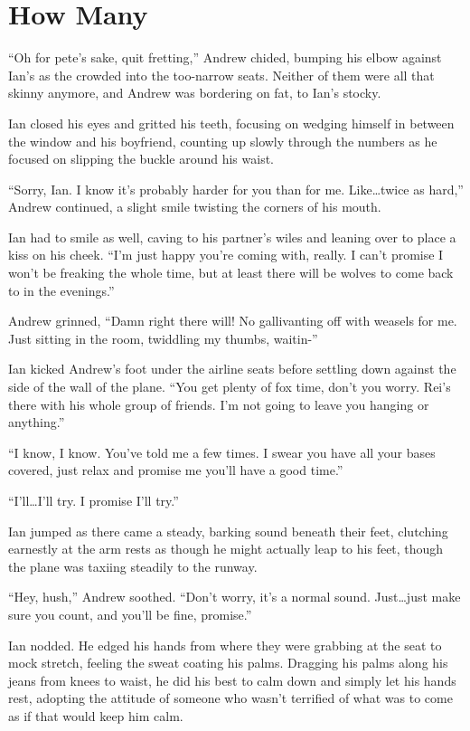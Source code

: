 \chapter{How Many}

``Oh for pete's sake, quit fretting,'' Andrew chided, bumping his elbow against Ian's as the crowded into the too-narrow seats. Neither of them were all that skinny anymore, and Andrew was bordering on fat, to Ian's stocky.

Ian closed his eyes and gritted his teeth, focusing on wedging himself in between the window and his boyfriend, counting up slowly through the numbers as he focused on slipping the buckle around his waist.

``Sorry, Ian. I know it's probably harder for you than for me. Like\ldots{}twice as hard,'' Andrew continued, a slight smile twisting the corners of his mouth.

Ian had to smile as well, caving to his partner's wiles and leaning over to place a kiss on his cheek. ``I'm just happy you're coming with, really. I can't promise I won't be freaking the whole time, but at least there will be wolves to come back to in the evenings.''

Andrew grinned, ``Damn right there will! No gallivanting off with weasels for me. Just sitting in the room, twiddling my thumbs, waitin-''

Ian kicked Andrew's foot under the airline seats before settling down against the side of the wall of the plane. ``You get plenty of fox time, don't you worry. Rei's there with his whole group of friends. I'm not going to leave you hanging or anything.''

``I know, I know. You've told me a few times. I swear you have all your bases covered, just relax and promise me you'll have a good time.''

``I'll\ldots{}I'll try. I promise I'll try.''

Ian jumped as there came a steady, barking sound beneath their feet, clutching earnestly at the arm rests as though he might actually leap to his feet, though the plane was taxiing steadily to the runway.

``Hey, hush,'' Andrew soothed. ``Don't worry, it's a normal sound. Just\ldots{}just make sure you count, and you'll be fine, promise.''

Ian nodded. He edged his hands from where they were grabbing at the seat to mock stretch, feeling the sweat coating his palms. Dragging his palms along his jeans from knees to waist, he did his best to calm down and simply let his hands rest, adopting the attitude of someone who wasn't terrified of what was to come as if that would keep him calm.

